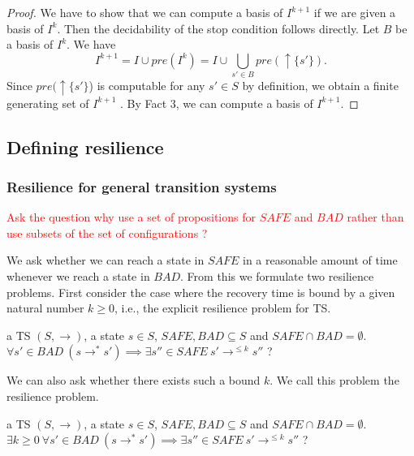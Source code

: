 \begin{proof}
We have to show that we can compute a basis of $I^{k+1}$ if we are given a basis of $I^k $. 
Then the
decidability of the stop condition follows directly. Let $B$ be a basis of $I^k$. 
We have
$$I^{k+1} = I \cup pre(I^k ) = I \cup
\bigcup_{s' \in B}
pre(\uparrow \{s' \}).$$
Since $pre(\uparrow \{s' \}$) is computable for any $s'\in S$ by definition, we obtain a finite generating set of $I^{k+1}$ . By
Fact 3, we can compute a basis of $I^{k+1}$.
\end{proof}
\subsection{Defining resilience}


\subsubsection{Resilience for general transition systems}

\textcolor{red}{Ask the question why use a set of propositions for $SAFE$ and $BAD$ rather than use subsets of the set of configurations ? }

We ask whether we can reach a state 
in 
%
$SAFE$  in a reasonable amount of time whenever we reach a state 
in
%
$BAD$. 
From this we formulate two resilience problems. First consider the case where the recovery time
is bound by a given natural number $k \geq 0$, i.e., the explicit resilience problem for TS.

{a TS $(S,\rightarrow)$, a state $s \in S$, $SAFE, BAD \subseteq S$ and $SAFE \cap BAD = \emptyset$.}
{$\forall s' \in BAD ~ (s \rightarrow^* s') \implies \exists s'' \in SAFE ~ s' \rightarrow^{\leq k} s''$ ?\newline}



We can also ask whether there exists such a bound $k$. We call this problem the resilience problem.


{a TS $(S,\rightarrow)$, a state $s \in S$, $SAFE, BAD \subseteq S$ and $SAFE \cap BAD = \emptyset$.}
{$\exists k \geq 0 ~ \forall s' \in BAD ~ (s \rightarrow^* s') \implies \exists s'' \in SAFE ~ s' \rightarrow^{\leq k} s''$ ?\newline}



